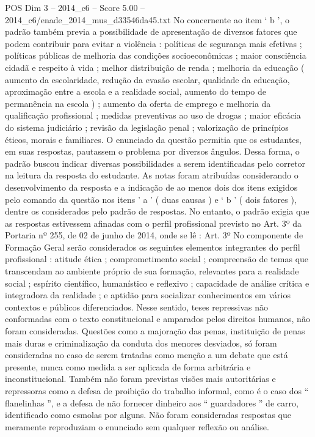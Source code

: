 \begin{textsample}{POS Dim 3 – 2014\_c6 – Score 5.00 – 2014\_c6/enade\_2014\_mus\_d33546da45.txt}
No concernente ao item ‘ b ’, o padrão também previa a possibilidade de apresentação de diversos fatores que podem contribuir para evitar a violência : políticas de segurança mais efetivas ; políticas públicas de melhoria das condições socioeconômicas ; maior consciência cidadã e respeito à vida ; melhor distribuição de renda ; melhoria da educação ( aumento da escolaridade, redução da evasão escolar, qualidade da educação, aproximação entre a escola e a realidade social, aumento do tempo de permanência na escola ) ; aumento da oferta de emprego e melhoria da qualificação profissional ; medidas preventivas ao uso de drogas ; maior eficácia do sistema judiciário ; revisão da legislação penal ; valorização de princípios éticos, morais e familiares.
O enunciado da questão permitia que os estudantes, em suas respostas, pautassem o problema por diversos ângulos.
Dessa forma, o padrão buscou indicar diversas possibilidades a serem identificadas pelo corretor na leitura da resposta do estudante.
As notas foram atribuídas considerando o desenvolvimento da resposta e a indicação de ao menos dois dos itens exigidos pelo comando da questão nos itens ’ a ’ ( duas causas ) e ‘ b ’ ( dois fatores ), dentre os considerados pelo padrão de respostas.
No entanto, o padrão exigia que as respostas estivessem afinadas com o perfil profissional previsto no Art. 3º da Portaria nº 255, de 02 de junho de 2014, onde se lê : Art. 3º No componente de Formação Geral serão considerados os seguintes elementos integrantes do perfil profissional : atitude ética ; comprometimento social ; compreensão de temas que transcendam ao ambiente próprio de sua formação, relevantes para a realidade social ; espírito científico, humanístico e reflexivo ; capacidade de análise crítica e integradora da realidade ; e aptidão para socializar conhecimentos em vários contextos e públicos diferenciados.
Nesse sentido, teses repressivas não conformadas com o texto constitucional e amparados pelos direitos humanos, não foram consideradas.
Questões como a majoração das penas, instituição de penas mais duras e criminalização da conduta dos menores desviados, só foram consideradas no caso de serem tratadas como menção a um debate que está presente, nunca como medida a ser aplicada de forma arbitrária e inconstitucional.
Também não foram previstas visões mais autoritárias e repressoras como a defesa de proibição do trabalho informal, como é o caso dos “ flanelinhas ”, e a defesa de não fornecer dinheiro aos “ guardadores ” de carro, identificado como esmolas por alguns.
Não foram consideradas respostas que meramente reproduziam o enunciado sem qualquer reflexão ou análise.

\end{textsample}
